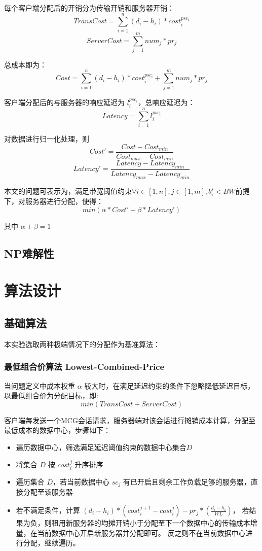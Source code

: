 每个客户端分配后的开销分为传输开销和服务器开销：
$$ TransCost = \sum\limits_{i=1}^n{(d_i-h_i)*cost_i^{psc_i}} $$
$$ ServerCost = \sum\limits_{j=1}^m{num_j} * pr_j $$

总成本即为：
$$ Cost = \sum\limits_{i=1}^n{(d_i-h_i)*cost_i^{psc_i}} + \sum\limits_{j=1}^m{num_j}*pr_j $$

客户端分配后的与服务器的响应延迟为 $ l_i^{psc_i} $，总响应延迟为：
$$Latency=\sum\limits_{i=1}^n{l_i^{psc_i}}$$

对数据进行归一化处理，则
$$ Cost' = \frac{Cost - Cost_{min}}{Cost_{max}-Cost_{min}}$$
$$ Latency'=\frac{Latency-Latency_{min}}{Latency_{max}-Latency_{min}}$$

本文的问题可表示为，满足带宽阈值约束$ \forall i \in [1,n], j\in [1,m], b_i^j < BW $前提下，对服务器进行分配，使得：
$$ min(\alpha*Cost' + \beta*Latency') $$

其中 $\alpha+\beta=1$

\section{NP难解性}

\chapter{算法设计}

\section{基础算法}
本实验选取两种极端情况下的分配作为基准算法：

\subsection{最低组合价算法 Lowest-Combined-Price}
当问题定义中成本权重 $ \alpha $ 较大时，在满足延迟约束的条件下忽略降低延迟目标，以最低组合价为分配目标，即:
$$ min(TransCost + ServerCost) $$

客户端每发送一个MCG会话请求，服务器端对该会话进行摊销成本计算，分配至最低成本的数据中心，步骤如下：
\begin{itemize}
    \item 遍历数据中心，筛选满足延迟阈值约束的数据中心集合$D$
    \item 将集合 $D$ 按 $cost_i^j$ 升序排序
    \item 遍历集合 $D$，若当前数据中心 $sc_j$ 有已开启且剩余工作负载足够的服务器，直接分配至该服务器
    \item 若不满足条件，计算 $ (d_i-h_i)*(cost_i^{j+1}-cost_i^j) - pr_j*(\frac{d_i-h_i}{WL}) $，
          若结果为负，则租用新服务器的均摊开销小于分配至下一个数据中心的传输成本增量，在当前数据中心开启新服务器并分配即可。
          反之则不在当前数据中心进行分配，继续遍历。
\end{itemize}

